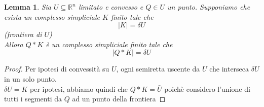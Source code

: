 \documentclass[a4paper]{report}
\newtheorem{lemma}{Lemma}
\newcommand{\R}{\ensuremath{\mathbb{R}}}
\begin{document}
\begin{center}

\end{center}
\begin{lemma}
    Sia $U\subseteq\R^n$ limitato e convesso e $Q\in U$ un punto. Supponiamo che esista un complesso simpliciale $K$ finito tale che
    \[
        |K|=\delta U    
    \]
    (frontiera di $U$)\\
    Allora $Q*K$ è un complesso simpliciale finito tale che
    \[
        |Q*K|=\delta U    
    \]
\end{lemma}
\begin{proof}
    Per ipotesi di convessità su $U$, ogni semiretta uscente da $U$ che interseca $\delta U$ in un solo punto.\\
    $\delta U=K$ per ipotesi, abbiamo quindi che $Q*K=\bar{U}$ poichè considero l'unione di tutti i segmenti da $Q$ ad un punto della frontiera
\end{proof}
\end{document}
